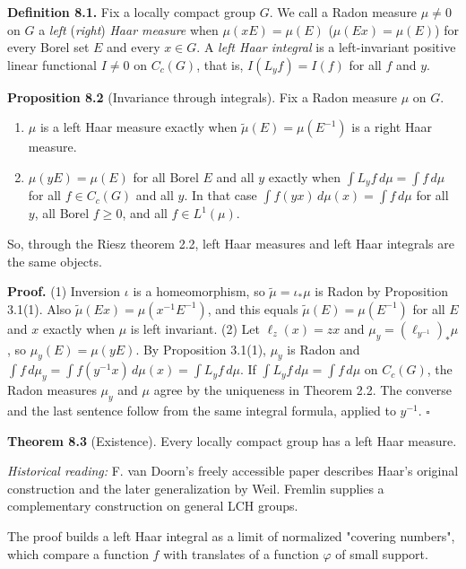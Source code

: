 \documentclass[
  english,
  11pt,
  a4paper,
]{article}
\providecommand{\tightlist}{%
  \setlength{\itemsep}{0pt}\setlength{\parskip}{0pt}}
\begin{document}
\textbf{Definition 8.1.} Fix a locally compact group \(G\). We call a
Radon measure \(\mu\neq0\) on \(G\) a \emph{left} (\emph{right})
\emph{Haar measure} when \(\mu(xE)=\mu(E)\) (\(\mu(Ex)=\mu(E)\)) for
every Borel set \(E\) and every \(x\in G\). A \emph{left Haar integral}
is a left-invariant positive linear functional \(I\neq0\) on \(C_c(G)\),
that is, \(I(L_yf)=I(f)\) for all \(f\) and \(y\).

\textbf{Proposition 8.2} (Invariance through integrals). Fix a Radon
measure \(\mu\) on \(G\).

\begin{enumerate}
\tightlist
\item
  \(\mu\) is a left Haar measure exactly when
  \(\tilde\mu(E)=\mu(E^{-1})\) is a right Haar measure.
\item
  \(\mu(yE)=\mu(E)\) for all Borel \(E\) and all \(y\) exactly when
  \(\int L_yf\,d\mu=\int f\,d\mu\) for all \(f\in C_c(G)\) and all
  \(y\). In that case \(\int f(yx)\,d\mu(x)=\int f\,d\mu\) for all
  \(y\), all Borel \(f\geq0\), and all \(f\in L^1(\mu)\).
\end{enumerate}

So, through the Riesz theorem 2.2, left Haar measures and left Haar
integrals are the same objects.

\textbf{Proof.} (1) Inversion \(\iota\) is a homeomorphism, so
\(\tilde\mu=\iota_*\mu\) is Radon by Proposition 3.1(1). Also
\(\tilde\mu(Ex)=\mu(x^{-1}E^{-1})\), and this equals
\(\tilde\mu(E)=\mu(E^{-1})\) for all \(E\) and \(x\) exactly when
\(\mu\) is left invariant. (2) Let \(\ell_z(x)=zx\) and
\(\mu_y=(\ell_{y^{-1}})_*\mu\), so \(\mu_y(E)=\mu(yE)\). By Proposition
3.1(1), \(\mu_y\) is Radon and
\(\int f\,d\mu_y=\int f(y^{-1}x)\,d\mu(x)=\int L_yf\,d\mu\). If
\(\int L_yf\,d\mu=\int f\,d\mu\) on \(C_c(G)\), the Radon measures
\(\mu_y\) and \(\mu\) agree by the uniqueness in Theorem 2.2. The
converse and the last sentence follow from the same integral formula,
applied to \(y^{-1}\). \(\square\)

\textbf{Theorem 8.3} (Existence). Every locally compact group has a left
Haar measure.

\emph{Historical reading:} F. van Doorn's freely accessible paper
describes Haar's original construction and the later generalization by
Weil. Fremlin supplies a complementary construction on general LCH
groups.

The proof builds a left Haar integral as a limit of normalized "covering
numbers", which compare a function \(f\) with translates of a function
\(\varphi\) of small support.
\end{document}

